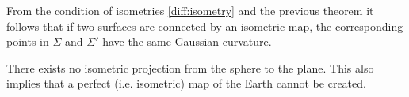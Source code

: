 	\begin{property}
    		From the condition of isometries \ref{diff:isometry} and the previous theorem it follows that if two surfaces are connected by an isometric map, the corresponding points in $\Sigma$ and $\Sigma'$ have the same Gaussian curvature.
	\end{property}
	\begin{result}
		There exists no isometric projection from the sphere to the plane. This also implies that a perfect (i.e. isometric) map of the Earth cannot be created.
	\end{result}